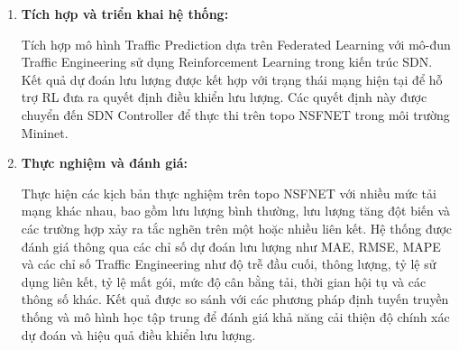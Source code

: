 \begin{enumerate}
    Xây dựng cơ chế Traffic Engineering sử dụng Reinforcement Learning (PPO). \textit{(For me)} Bài toán được mô hình hóa thành MDP: Trạng thái (State) gồm 104 chiều (mức sử dụng 42 liên kết hiện tại, 42 dự đoán tương lai, 20 nhu cầu lưu lượng); Hành động (Action) là không gian rời rạc (MultiDiscrete) chọn 1 trong 3 đường đi (K=3) cho top 20 luồng giao thông lớn nhất; Phần thưởng (Reward) được tính bằng hàm phạt trọng số dựa trên MLU (Maximum Link Utilization), độ trễ đầu cuối và tỷ lệ mất gói (dựa trên mô hình hàng đợi M/M/1). Quyết định điều khiển sẽ được chuyển đến SDN Controller để thực thi thông qua việc cập nhật các quy tắc chuyển tiếp (Flow Rules) trên mạng.

    \item \textbf{Tích hợp và triển khai hệ thống:}
    
    Tích hợp mô hình Traffic Prediction dựa trên Federated Learning với mô-đun Traffic Engineering sử dụng Reinforcement Learning trong kiến trúc SDN. Kết quả dự đoán lưu lượng được kết hợp với trạng thái mạng hiện tại để hỗ trợ RL đưa ra quyết định điều khiển lưu lượng. Các quyết định này được chuyển đến SDN Controller để thực thi trên topo NSFNET trong môi trường Mininet.

    \item \textbf{Thực nghiệm và đánh giá:}
    
    Thực hiện các kịch bản thực nghiệm trên topo NSFNET với nhiều mức tải mạng khác nhau, bao gồm lưu lượng bình thường, lưu lượng tăng đột biến và các trường hợp xảy ra tắc nghẽn trên một hoặc nhiều liên kết. Hệ thống được đánh giá thông qua các chỉ số dự đoán lưu lượng như MAE, RMSE, MAPE và các chỉ số Traffic Engineering như độ trễ đầu cuối, thông lượng, tỷ lệ sử dụng liên kết, tỷ lệ mất gói, mức độ cân bằng tải, thời gian hội tụ và các thông số khác. Kết quả được so sánh với các phương pháp định tuyến truyền thống và mô hình học tập trung để đánh giá khả năng cải thiện độ chính xác dự đoán và hiệu quả điều khiển lưu lượng.
\end{enumerate}
